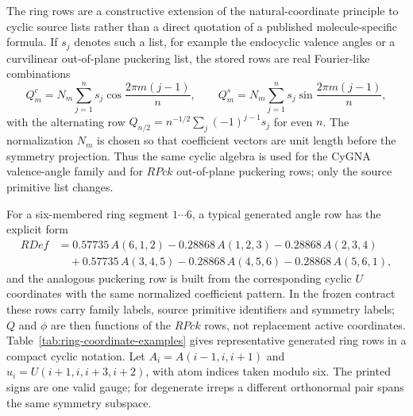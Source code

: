 \documentclass[journal=jctcce,manuscript=article,layout=traditional]{achemso}
\theoremstyle{definition}
\begin{document}
The ring rows are a constructive extension of the natural-coordinate principle
to cyclic source lists rather than a direct quotation of a published
molecule-specific formula.  If \(s_j\) denotes such a list, for example the
endocyclic valence angles or a curvilinear out-of-plane puckering list, the stored rows are
real Fourier-like combinations
\begin{equation}
\label{eq:ring-fourier-combinations}
  Q_m^c = N_m\sum_{j=1}^{n} s_j\cos\frac{2\pi m(j-1)}{n},\qquad
  Q_m^s = N_m\sum_{j=1}^{n} s_j\sin\frac{2\pi m(j-1)}{n},
\end{equation}
with the alternating row \(Q_{n/2}=n^{-1/2}\sum_j(-1)^{j-1}s_j\) for even
\(n\).  The normalization \(N_m\) is chosen so that coefficient vectors are
unit length before the symmetry projection.  Thus the same cyclic algebra is
used for the CyGNA valence-angle family and for \(RPck\) out-of-plane puckering
rows; only the source primitive list changes.

For a six-membered ring segment \(1\cdots6\), a typical generated angle row has
the explicit form
\begin{equation}
\label{eq:explicit-ring-rdef}
\begin{aligned}
RDef &=
 0.57735\,A(6,1,2)-0.28868\,A(1,2,3)-0.28868\,A(2,3,4) \\
&\quad +0.57735\,A(3,4,5)-0.28868\,A(4,5,6)-0.28868\,A(5,6,1),
\end{aligned}
\end{equation}
and the analogous puckering row is built from the corresponding cyclic
\(U\) coordinates with the same normalized coefficient pattern.  In the frozen
contract these rows carry family labels, source primitive identifiers and
symmetry labels; \(Q\) and \(\phi\) are then functions of the \(RPck\) rows, not
replacement active coordinates.
Table~\ref{tab:ring-coordinate-examples} gives representative generated ring
rows in a compact cyclic notation.  Let
\(A_i=A(i-1,i,i+1)\) and
\(u_i=U(i+1,i,i+3,i+2)\), with atom indices taken
modulo six.  The printed signs are one valid gauge; for degenerate irreps a
different orthonormal pair spans the same symmetry subspace.
\end{document}
